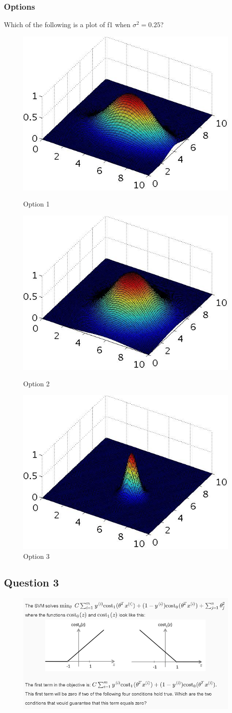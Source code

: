 \documentclass[11pt]{article} %
\begin{document}
\subsubsection*{Options}
Which of the following is a plot of f1 when $\sigma^2 = 0.25$?
\begin{figure}[h!]
		\centering
		\includegraphics[width=0.4\linewidth]{images/SVM3}
	\caption{Option 1}
		\includegraphics[width=0.4\linewidth]{images/SVM4}
	\caption{Option 2}
		\includegraphics[width=0.4\linewidth]{images/SVM5}
		\caption{Option 3}		
\end{figure}
\newpage




\subsection*{Question 3}
\begin{figure}[h!]
\centering
\includegraphics[width=01.1\linewidth]{images/SVM-costquestion}
\end{figure}
\end{document}
